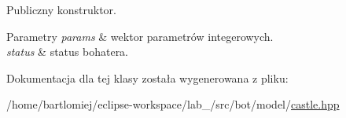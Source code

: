 Publiczny konstruktor. 


\begin{DoxyParams}{Parametry}
{\em params} & wektor parametrów integerowych. \\
\hline
{\em status} & status bohatera. \\
\hline
\end{DoxyParams}


Dokumentacja dla tej klasy została wygenerowana z pliku\+:\begin{DoxyCompactItemize}
\item 
/home/bartlomiej/eclipse-\/workspace/lab\+\_/src/bot/model/\hyperlink{castle_8hpp}{castle.\+hpp}\end{DoxyCompactItemize}
